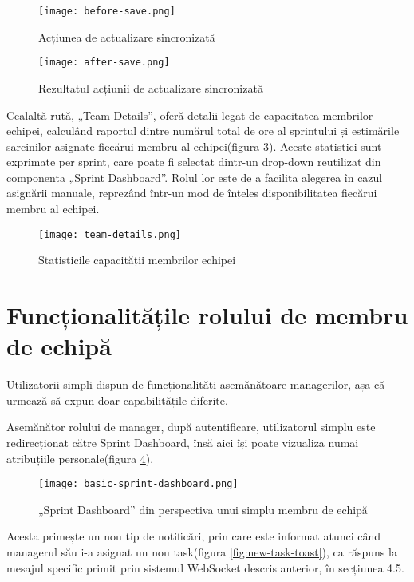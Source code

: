  \begin{figure}[H]
	\centering
 	 \texttt{[image: before-save.png]}
	\caption{Acțiunea de actualizare sincronizată}
	\label{fig:ws-sync-1}
 \end{figure}

 \begin{figure}[H]
	\centering
	 \texttt{[image: after-save.png]}
	\caption{Rezultatul acțiunii de actualizare sincronizată}
	\label{fig:ws-sync-2}
 \end{figure}

Cealaltă rută, „Team Details”, oferă detalii legat de capacitatea membrilor echipei, calculând raportul dintre numărul total de ore al sprintului și estimările sarcinilor asignate fiecărui membru al echipei(figura \ref{fig:team-details}). Aceste statistici sunt exprimate per sprint, care poate fi selectat dintr-un drop-down reutilizat din componenta „Sprint Dashboard”. Rolul lor este de a facilita alegerea în cazul asignării manuale, reprezând într-un mod de înțeles disponibilitatea fiecărui membru al echipei.

 \begin{figure}[H]
	\centering
 	 \texttt{[image: team-details.png]}
	\caption{Statisticile capacității membrilor echipei}
	\label{fig:team-details}
 \end{figure}

\section{Funcționalitățile rolului de membru de echipă}

Utilizatorii simpli dispun de funcționalități asemănătoare managerilor, așa că urmează să expun doar capabilitățile diferite.

Asemănător rolului de manager, după autentificare, utilizatorul simplu este redirecționat către Sprint Dashboard, însă aici își poate vizualiza numai atribuțiile personale(figura \ref{fig:basic-sprint-dashboard}).

 \begin{figure}[H]
	\centering
 	 \texttt{[image: basic-sprint-dashboard.png]}
	\caption{„Sprint Dashboard” din perspectiva unui simplu membru de echipă}
	\label{fig:basic-sprint-dashboard}
 \end{figure}

Acesta primește un nou tip de notificări, prin care este informat atunci când managerul său i-a asignat un nou task(figura \ref{fig:new-task-toast}), ca răspuns la mesajul specific primit prin sistemul WebSocket descris anterior, în secțiunea 4.5.

